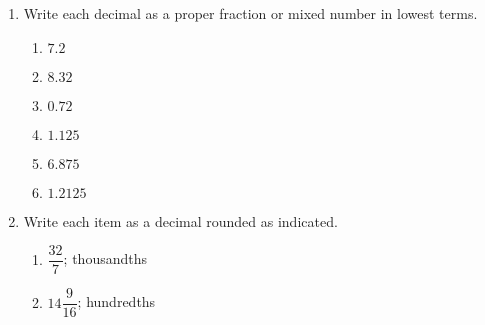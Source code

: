 \documentclass[12pt]{article}
\begin{document}
\begin{enumerate}
\begin{multicols}{2}
\begin{enumerate}
\item \hspace{0.5in} $\dfrac{24}{8}$
  \vspace{0.25in}

\end{enumerate}
\end{multicols}

\item Write each decimal as a proper fraction or mixed number in lowest terms.
\begin{multicols}{2}
\begin{enumerate}

\item \hspace{0.5in} $7.2$
  \vspace{0.25in}

\item \hspace{0.5in} $8.32$
  \vspace{0.25in}

\item \hspace{0.5in} $0.72$
  \vspace{0.25in}

\item \hspace{0.5in} $1.125$
  \vspace{0.25in}

\item \hspace{0.5in} $6.875$
  \vspace{0.25in}

\item \hspace{0.5in} $1.2125$
  \vspace{0.25in}

\end{enumerate}
\end{multicols}
  \vspace{0.5in}

\item Write each item as a decimal rounded as indicated. 
\begin{multicols}{2}
\begin{enumerate}
	\item \hspace{0.5in} $\dfrac{32}{7}$; thousandths 
  \vspace{0.25in}

\item \hspace{0.5in} $14\dfrac{9}{16}$; hundredths
  \vspace{0.25in}


\end{enumerate}
\end{multicols}
\end{enumerate}
\end{document}

